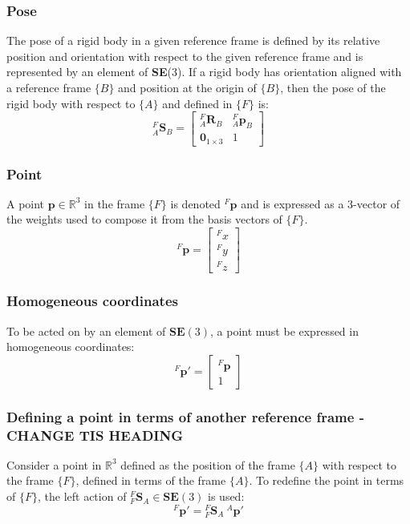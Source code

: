 		\subsubsection{Pose}
		The pose of a rigid body in a given reference frame is defined by its relative position and orientation with respect to the given reference frame and is represented by an element of \textbf{SE}(3). If a rigid body has orientation aligned with a reference frame $\{B\}$ and position at the origin of $\{B\}$, then the pose of the rigid body with respect to $\{A\}$ and defined in $\{F\}$ is:
		\begin{equation}
			{^{F}_{A}\mathbf{S}^{}_{B}} = 
			\begin{bmatrix}
				^{F}_{A}\mathbf{R}^{}_{B}	& 	^{F}_{A}\mathbf{p}^{}_{B}\\
				\textbf{0}_{1 \times 3} & 1						  
			\end{bmatrix}
		\end{equation}		
		
		\subsubsection{Point}
		A point $\mathbf{p} \in \mathbb{R}^3$ in the frame $\{F\}$ is denoted $^F\mathbf{p}$ and is expressed as a 3-vector of the weights used to compose it from the basis vectors of $\{F\}$.
		\begin{equation}
			^{F}\mathbf{p} = 
			\begin{bmatrix}
				^{F}x \\
				^{F}y \\
				^{F}z
			\end{bmatrix}
		\end{equation}
		
		\subsubsection{Homogeneous coordinates}
		To be acted on by an element of $\mathbf{SE}(3)$, a point must be expressed in homogeneous coordinates:
		\begin{equation}
			^{F}\mathbf{p'} = 
			\begin{bmatrix}
				^{F}\mathbf{p} \\
				1
			\end{bmatrix}
		\end{equation}
		
		\subsubsection{Defining a point in terms of another reference frame - CHANGE TIS HEADING}
		Consider a point in $\mathbb{R}^3$ defined as the position of the frame $\{A\}$ with respect to the frame $\{F\}$, defined in terms of the frame $\{A\}$. To redefine the point in terms of $\{F\}$, the left action of ${^{F}_{F}\mathbf{S}^{}_{A}} \in \mathbf{SE}(3)$ is used:
		\begin{equation}
			^{F}\mathbf{p'} = {^{F}_{F}\mathbf{S}^{}_{A}}\:^{A}\mathbf{p'}
		\end{equation}
		
